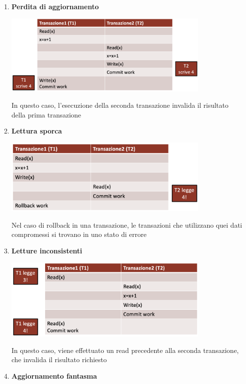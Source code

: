 \documentclass{article}
\begin{document}
\begin{enumerate}[leftmargin=1cm]
    \item \textbf{Perdita di aggiornamento}
    \begin{center}
        \includegraphics[width=0.8\textwidth]{foto 1.png}
    \end{center}
    In questo caso, l'esecuzione della seconda transazione invalida il risultato della prima transazione
    \item \textbf{Lettura sporca}
    \begin{center}
        \includegraphics[width=0.8\textwidth]{foto 2.png}
    \end{center}
    Nel caso di rollback in una transazione, le transazioni che utilizzano quei dati compromessi si trovano in uno stato di errore
    \item \textbf{Letture inconsistenti}
    \begin{center}
        \includegraphics[width=0.8\textwidth]{foto 3.png}
    \end{center}
    In questo caso, viene effettuato un read precedente alla seconda transazione, che invalida il risultato richiesto
    \item \textbf{Aggiornamento fantasma}
    \begin{center}

\end{center}
\end{enumerate}
\end{document}
